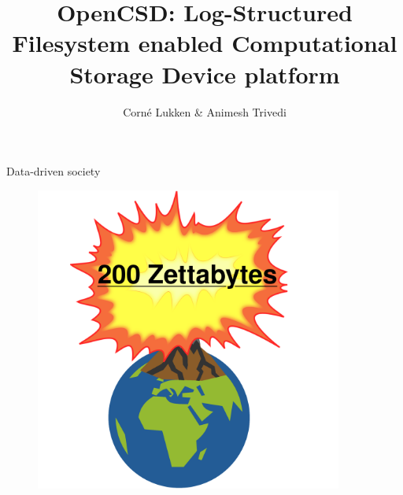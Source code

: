 \documentclass{beamer}
\author{Corné Lukken \& Animesh Trivedi}
\title{OpenCSD: Log-Structured Filesystem enabled Computational Storage Device
platform}
\begin{document}

\frame{\titlepage}
\begin{frame}{Data-driven society}
	\begingroup
	\small
	\begin{figure}
		\centering
		\includegraphics[width=0.9\textwidth]{resources/images/data-problem.png}
	\end{figure}
	\endgroup
\end{frame}
\end{document}
